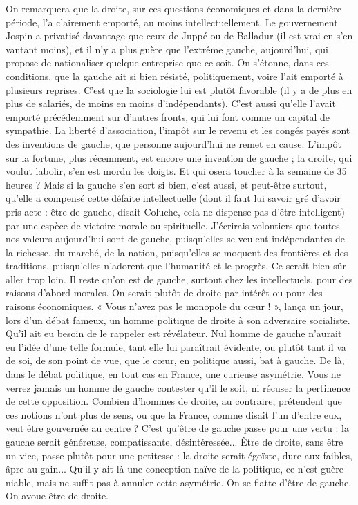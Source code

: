 On remarquera que la droite, sur ces questions économiques et dans la dernière
période, l’a clairement emporté, au moins intellectuellement. Le gouvernement
Jospin a privatisé davantage que ceux de Juppé ou de Balladur (il est
vrai en s’en vantant moins), et il n’y a plus guère que l’extrême gauche,
aujourd’hui, qui propose de nationaliser quelque entreprise que ce soit. On
s'étonne, dans ces conditions, que la gauche ait si bien résisté, politiquement,
voire l’ait emporté à plusieurs reprises. C’est que la sociologie lui est plutôt
favorable (il y a de plus en plus de salariés, de moins en moins
d’indépendants). C’est aussi qu’elle l'avait emporté précédemment sur d’autres
fronts, qui lui font comme un capital de sympathie. La liberté d’association,
l'impôt sur le revenu et les congés payés sont des inventions de gauche, que
personne aujourd’hui ne remet en cause. L’impôt sur la fortune, plus récemment,
est encore une invention de gauche ; la droite, qui voulut labolir, s’en
est mordu les doigts. Et qui osera toucher à la semaine de 35 heures ? Mais si
la gauche s’en sort si bien, c’est aussi, et peut-être surtout, qu’elle a compensé
cette défaite intellectuelle (dont il faut lui savoir gré d’avoir pris acte : être de
gauche, disait Coluche, cela ne dispense pas d’être intelligent) par une espèce
de victoire morale ou spirituelle. J’écrirais volontiers que toutes nos valeurs
aujourd’hui sont de gauche, puisqu'elles se veulent indépendantes de la
richesse, du marché, de la nation, puisqu'elles se moquent des frontières et des
traditions, puisqu'elles n’adorent que l'humanité et le progrès. Ce serait bien
sûr aller trop loin. Il reste qu’on est de gauche, surtout chez les intellectuels,
pour des raisons d’abord morales. On serait plutôt de droite par intérêt ou pour
des raisons économiques. « Vous n’avez pas le monopole du cœur ! », lança un
jour, lors d’un débat fameux, un homme politique de droite à son adversaire
socialiste. Qu'il ait eu besoin de le rappeler est révélateur. Nul homme de
gauche n’aurait eu l’idée d’une telle formule, tant elle lui paraîtrait évidente, ou
plutôt tant il va de soi, de son point de vue, que le cœur, en politique aussi, bat
à gauche. De là, dans le débat politique, en tout cas en France, une curieuse
asymétrie. Vous ne verrez jamais un homme de gauche contester qu’il le soit,
ni récuser la pertinence de cette opposition. Combien d'hommes de droite, au
contraire, prétendent que ces notions n’ont plus de sens, ou que la France,
comme disait l’un d’entre eux, veut être gouvernée au centre ? C’est qu'être de
gauche passe pour une vertu : la gauche serait généreuse, compatissante, désintéressée...
Être de droite, sans être un vice, passe plutôt pour une petitesse : la
droite serait égoïste, dure aux faibles, âpre au gain... Qu'il y ait là une conception
naïve de la politique, ce n’est guère niable, mais ne suffit pas à annuler
cette asymétrie. On se flatte d’être de gauche. On avoue être de droite.

